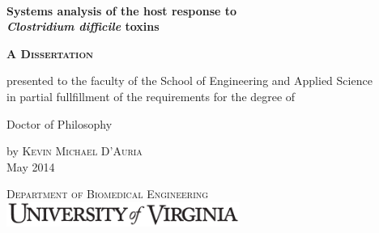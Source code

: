 \begin{titlepage}
\begin{caslonpro}

\center 

~~~

{\makeatletter\let\newcommand\renewcommand


\vspace{0.5in}

{ \Huge \textbf{Systems analysis of the host response to} \\[0.1in]
      \textbf{\emph{Clostridium difficile} toxins} }\\[0.4cm] 
               
\vspace{0.9in}
       

\textsc{\LARGE \textbf{A Dissertation}}\\[0.3in] %

\vspace{0.6in}

presented to the faculty of the School
of Engineering and Applied Science \\
in partial fullfillment of the
requirements for the degree of

\vspace{0.3in} 

\Large Doctor of Philosophy

\vspace{1.3in}

by \textsc{ \huge Kevin Michael D'Auria } \\[0.05in]
\large May 2014

\vspace{1.4in}

\textsc{\Large Department of Biomedical Engineering}\\[0.1in] 
\includegraphics[width=3in]{TitlePage/uvaname.pdf}\\[0.02in]

} %

\end{caslonpro}

\end{titlepage}

\thispagestyle{empty}
\cleardoublepage

